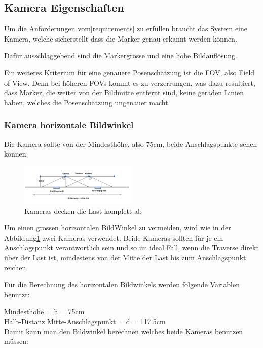 \subsection{Kamera Eigenschaften}

Um die Anforderungen vom\ref{requirements} zu erfüllen braucht das System eine Kamera, welche sicherstellt dass die Marker genau erkannt werden können.

Dafür ausschlaggebend sind die Markergrösse und eine hohe Bildauflösung\cite{noauthor_designing_2020}. 

Ein weiteres Kriterium für eine genauere Posenschätzung ist die FOV, also Field of View. 
Denn bei höheren FOVs kommt es zu verzerrungen, was dazu resultiert, dass Marker, die weiter von der Bildmitte entfernt sind, keine geraden Linien haben, welches die Posenschätzung ungenauer macht.


\subsubsection{Kamera horizontale Bildwinkel}

Die Kamera sollte von der Mindesthöhe, also 75cm, beide Anschlagspunkte sehen können.

\begin{figure}[H]
    \centering
    \includegraphics[width=0.5\textwidth]{graphics/KameraFOV.png}\hfill%
    \caption{Kameras decken die Last komplett ab}
    \label{fig:FOV}
\end{figure}

Um einen grossen horizontalen BildWinkel zu vermeiden, wird wie in der Abbildung\ref{fig:FOV} zwei Kameras verwendet. 
Beide Kameras sollten für je ein Anschlagspunkt verantwortlich sein und so im ideal Fall, wenn die Traverse direkt über der Last ist, mindestens von der Mitte der Last bis zum Anschlagspunkt reichen.

Für die Berechnung des horizontalen Bildwinkels werden folgende Variablen benutzt:

Mindesthöhe = h = 75cm\\
Halb-Distanz Mitte-Anschlagspunkt = d = 117.5cm\\

Damit kann man den Bildwinkel berechnen welches beide Kameras benutzen müssen:

